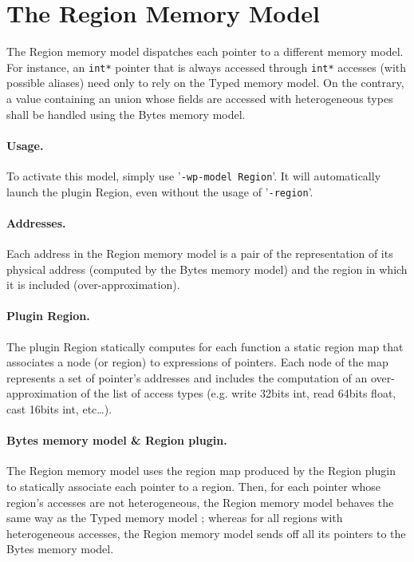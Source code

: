 
\section{The Region Memory Model}

The Region memory model dispatches each pointer to a different memory model.
For instance, an \texttt{int*} pointer that is always accessed through
\texttt{int*} accesses (with possible aliases) need only to rely on the Typed
memory model. On the contrary, a value containing an union whose fields are
accessed with heterogeneous types shall be handled using the Bytes memory model.

\paragraph{Usage.} To activate this model, simply use '\texttt{-wp-model Region}'.
It will automatically launch the plugin Region, even without the usage of
'\texttt{-region}'.

\paragraph{Addresses.} Each address in the Region memory model is a pair of
the representation of its physical address (computed by the Bytes memory
model) and the region in which it is included (over-approximation).

\paragraph{Plugin Region.}
The plugin Region statically computes for each function a static region
map that associates a node (or region) to expressions of pointers. Each
node of the map represents a set of pointer's addresses and includes
the computation of an over-approximation of the list of access types
(e.g. write 32bits int, read 64bits float, cast 16bits int, etc\dots).

\paragraph{Bytes memory model \& Region plugin.}
The Region memory model uses the region map produced by the Region
plugin to statically associate each pointer to a region. Then, for each
pointer whose region's accesses are not heterogeneous, the Region memory
model behaves the same way as the Typed memory model ; whereas for all
regions with heterogeneous accesses, the Region memory model sends off all
its pointers to the Bytes memory model.

